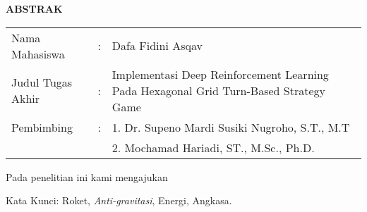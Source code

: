 \begin{center}
  \large\textbf{ABSTRAK}
\end{center}


\vspace{2ex}

\begingroup
  \setlength{\tabcolsep}{0pt}

  \noindent
  \begin{tabularx}{\textwidth}{l >{\centering}m{2em} X}
    Nama Mahasiswa    &:& Dafa Fidini Asqav \\

    Judul Tugas Akhir &:&	Implementasi Deep Reinforcement Learning Pada Hexagonal Grid Turn-Based Strategy Game \\

    Pembimbing        &:& 1. Dr. Supeno Mardi Susiki Nugroho, S.T., M.T \\
                      & & 2. Mochamad Hariadi, ST., M.Sc., Ph.D. \\
  \end{tabularx}
\endgroup

Pada penelitian ini kami mengajukan \lipsum[1]

Kata Kunci: Roket, \emph{Anti-gravitasi}, Energi, Angkasa.
